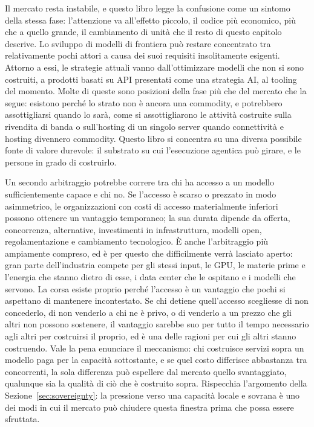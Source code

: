 \documentclass[10pt,oneside,openany]{book}
\begin{document}
Il mercato resta instabile, e questo libro legge la confusione come un sintomo della stessa fase: l'attenzione va all'effetto piccolo, il codice più economico, più che a quello grande, il cambiamento di unità che il resto di questo capitolo descrive. Lo sviluppo di modelli di frontiera può restare concentrato tra relativamente pochi attori a causa dei suoi requisiti insolitamente esigenti. Attorno a essi, le strategie attuali vanno dall'ottimizzare modelli che non si sono costruiti, a prodotti basati su API presentati come una strategia AI, al tooling del momento. Molte di queste sono posizioni della fase più che del mercato che la segue: esistono perché lo strato non è ancora una commodity, e potrebbero assottigliarsi quando lo sarà, come si assottigliarono le attività costruite sulla rivendita di banda o sull'hosting di un singolo server quando connettività e hosting divennero commodity. Questo libro si concentra su una diversa possibile fonte di valore durevole: il substrato su cui l'esecuzione agentica può girare, e le persone in grado di costruirlo.

\begin{notebox}
Un secondo arbitraggio potrebbe correre tra chi ha accesso a un modello sufficientemente capace e chi no. Se l'accesso è scarso o prezzato in modo asimmetrico, le organizzazioni con costi di accesso materialmente inferiori possono ottenere un vantaggio temporaneo; la sua durata dipende da offerta, concorrenza, alternative, investimenti in infrastruttura, modelli open, regolamentazione e cambiamento tecnologico. È anche l'arbitraggio più ampiamente compreso, ed è per questo che difficilmente verrà lasciato aperto: gran parte dell'industria compete per gli stessi input, le GPU, le materie prime e l'energia che stanno dietro di esse, i data center che le ospitano e i modelli che servono. La corsa esiste proprio perché l'accesso è un vantaggio che pochi si aspettano di mantenere incontestato. Se chi detiene quell'accesso scegliesse di non concederlo, di non venderlo a chi ne è privo, o di venderlo a un prezzo che gli altri non possono sostenere, il vantaggio sarebbe suo per tutto il tempo necessario agli altri per costruirsi il proprio, ed è una delle ragioni per cui gli altri stanno costruendo. Vale la pena enunciare il meccanismo: chi costruisce servizi sopra un modello paga per la capacità sottostante, e se quel costo differisce abbastanza tra concorrenti, la sola differenza può espellere dal mercato quello svantaggiato, qualunque sia la qualità di ciò che è costruito sopra. Rispecchia l'argomento della Sezione~\ref{sec:sovereignty}: la pressione verso una capacità locale e sovrana è uno dei modi in cui il mercato può chiudere questa finestra prima che possa essere sfruttata.
\end{notebox}
\end{document}
